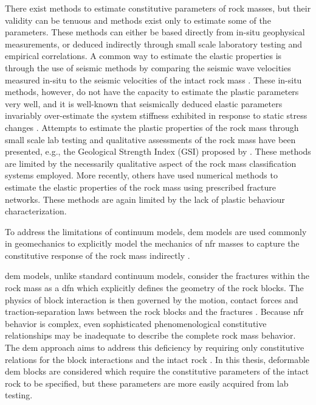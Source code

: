 There exist methods to estimate constitutive parameters of rock masses, but their validity can be tenuous and methods exist only to estimate some of the parameters. These methods can either be based directly from in-situ geophysical measurements, or deduced indirectly through small scale laboratory testing and empirical correlations. A common way to estimate the elastic properties is through the use of seismic methods by comparing the seismic wave velocities measured in-situ to the seismic velocities of the intact rock mass \citep{SJOGREN_1979}. These in-situ methods, however, do not have the capacity to estimate the plastic parameters very well, and it is well-known that seismically deduced elastic parameters invariably over-estimate the system stiffness exhibited in response to static stress changes \citep{Barton_2006}. Attempts to estimate the plastic properties of the rock mass through small scale lab testing and qualitative assessments of the rock mass have been presented, e.g., the Geological Strength Index (GSI) proposed by \citet{Hoek_1997}. These methods are limited by the necessarily qualitative aspect of the rock mass classification systems employed. More recently, others \citep{Min_2003,Chen_2012,Bidgoli_2013} have used numerical methods to estimate the elastic properties of the rock mass using prescribed fracture networks. These methods are again limited by the lack of plastic behaviour characterization. 

To address the limitations of continuum models, \acrfull{dem} models are used commonly in geomechanics to explicitly model the mechanics of \acrfull{nfr} masses to capture the constitutive response of the rock mass indirectly \citep{jing_review_2003}. 

\acrshort{dem} models, unlike standard continuum models, consider the fractures within the rock mass as a \acrfull{dfn} which explicitly defines the geometry of the rock blocks. The physics of block interaction is then governed by the motion, contact forces and traction-separation laws between the rock blocks and the fractures \citep{Thallak_1990}. Because \acrshort{nfr} behavior is complex, even sophisticated phenomenological constitutive relationships may be inadequate to describe the complete rock mass behavior. The \acrshort{dem} approach aims to address this deficiency by requiring only constitutive relations for the block interactions and the intact rock \citep{Barbosa_1990}. In this thesis,  deformable \acrshort{dem} blocks are considered which require the constitutive parameters of the intact rock to be specified, but these parameters are more easily acquired from lab testing. 

